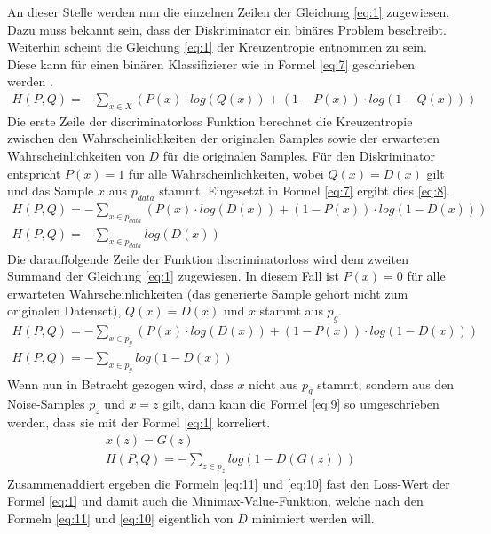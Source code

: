 An dieser Stelle werden nun die einzelnen Zeilen der Gleichung \ref{eq:1} zugewiesen. Dazu muss bekannt sein, dass der
Diskriminator ein binäres Problem beschreibt. Weiterhin scheint die Gleichung \ref{eq:1} der Kreuzentropie entnommen zu sein. Diese
kann für einen binären Klassifizierer wie in Formel \ref{eq:7} geschrieben werden \cite{stackoverflow:1:crossEntropy}.
\begin{align}
    H(P,Q) = - \sum_{x \in X} (P(x) \cdot log(Q(x)) + (1 - P(x)) \cdot log(1 - Q(x))) \label{eq:7}
\end{align}
Die erste Zeile der \glqq discriminator\textunderscore loss\grqq{} Funktion berechnet die Kreuzentropie zwischen den Wahrscheinlichkeiten der originalen Samples
sowie der erwarteten Wahrscheinlichkeiten von $D$ für die originalen Samples. Für den Diskriminator entspricht $P(x) = 1$ für alle Wahrscheinlichkeiten,
wobei $Q(x) = D(x)$ gilt und das Sample $x$ aus $p_{data}$ stammt. Eingesetzt in Formel \ref{eq:7} ergibt dies \ref{eq:8}.
\begin{align}
    H(P,Q) = - \sum_{x \in p_{data}} (P(x) \cdot log(D(x)) + (1 - P(x)) \cdot log(1 - D(x))) \label{eq:8}\\
    H(P,Q) = - \sum_{x \in p_{data}} log(D(x)) \label{eq:11}
\end{align}
Die darauffolgende Zeile der Funktion \glqq discriminator\textunderscore loss\grqq{} wird dem zweiten Summand der Gleichung \ref{eq:1} zugewiesen.
In diesem Fall ist $P(x) = 0$ für alle erwarteten Wahrscheinlichkeiten (das generierte Sample gehört nicht zum
originalen Datenset), $Q(x) = D(x)$ und $x$ stammt aus $p_{g}$.
\begin{align}
    H(P,Q) = - \sum_{x \in p_{g}} (P(x) \cdot log(D(x)) + (1 - P(x)) \cdot log(1 - D(x)))\\
    H(P,Q) = - \sum_{x \in p_{g}} log(1 - D(x)) \label{eq:9}
\end{align}
Wenn nun in Betracht gezogen wird, dass $x$ nicht aus $p_g$ stammt, sondern aus den Noise-Samples $p_z$ und $x = z$ gilt,
dann kann die Formel \ref{eq:9} so umgeschrieben werden, dass sie mit der Formel \ref{eq:1} korreliert.
\begin{align}
    x(z) = G(z)\\
    H(P,Q) = - \sum_{z \in p_{z}} log(1 - D(G(z))) \label{eq:10}
\end{align}
Zusammenaddiert ergeben die Formeln \ref{eq:11} und \ref{eq:10} fast den Loss-Wert der Formel \ref{eq:1} und damit auch die Minimax-Value-Funktion,
welche nach den Formeln \ref{eq:11} und \ref{eq:10} eigentlich von $D$ minimiert werden will.
